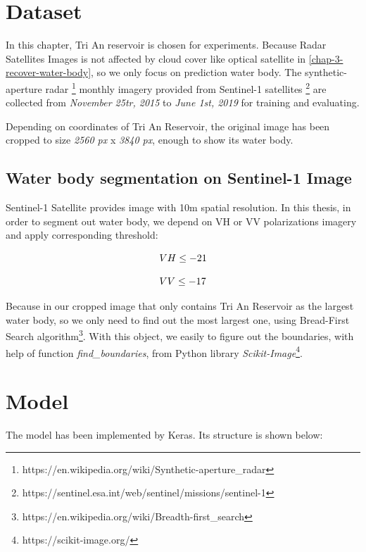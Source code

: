 \section{Dataset} 

In this chapter, Tri An reservoir is chosen for experiments. Because Radar Satellites Images is not affected by cloud cover like optical satellite in \ref{chap-3-recover-water-body}, so we only focus on prediction water body. The synthetic-aperture radar \footnote{https://en.wikipedia.org/wiki/Synthetic-aperture\_radar} monthly imagery provided from Sentinel-1 satellites \footnote{https://sentinel.esa.int/web/sentinel/missions/sentinel-1} are collected from \textit{November 25tr, 2015} to \textit{June 1st, 2019} for training and evaluating. 

Depending on coordinates of Tri An Reservoir, the original image has been cropped to size \textit{2560 px} x \textit{3840 px}, enough to show its water body.

\subsection{Water body segmentation on Sentinel-1 Image}

Sentinel-1 Satellite provides image with 10m spatial resolution. In this thesis, in order to segment out water body, we depend on VH or VV polarizations imagery and apply corresponding threshold:

\begin{equation}
\centering
VH \leq -21
\end{equation} 

\begin{equation}
\centering
VV \leq -17
\end{equation} 

Because in our cropped image that only contains Tri An Reservoir as the largest water body, so we only need to find out the most largest one, using Bread-First Search algorithm\footnote{https://en.wikipedia.org/wiki/Breadth-first\_search}. With this object, we easily to figure out the boundaries, with help of function \textit{find\_boundaries}, from Python library \textit{Scikit-Image}\footnote{https://scikit-image.org/}.

\section{Model}

The model has been implemented by Keras. Its structure is shown below:

